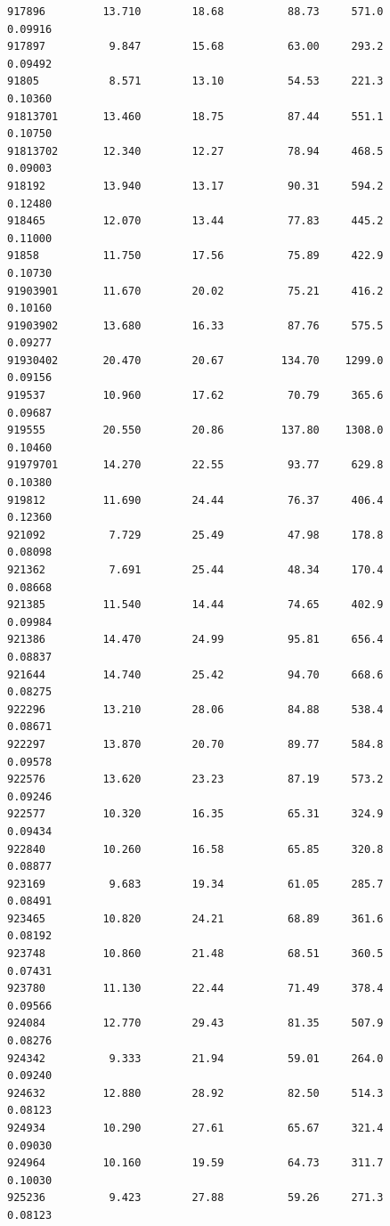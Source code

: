 \documentclass[
  letterpaper,
  DIV=11,
  numbers=noendperiod]{scrartcl}
\begin{document}
\begin{verbatim}
917896         13.710        18.68          88.73     571.0         0.09916
917897          9.847        15.68          63.00     293.2         0.09492
91805           8.571        13.10          54.53     221.3         0.10360
91813701       13.460        18.75          87.44     551.1         0.10750
91813702       12.340        12.27          78.94     468.5         0.09003
918192         13.940        13.17          90.31     594.2         0.12480
918465         12.070        13.44          77.83     445.2         0.11000
91858          11.750        17.56          75.89     422.9         0.10730
91903901       11.670        20.02          75.21     416.2         0.10160
91903902       13.680        16.33          87.76     575.5         0.09277
91930402       20.470        20.67         134.70    1299.0         0.09156
919537         10.960        17.62          70.79     365.6         0.09687
919555         20.550        20.86         137.80    1308.0         0.10460
91979701       14.270        22.55          93.77     629.8         0.10380
919812         11.690        24.44          76.37     406.4         0.12360
921092          7.729        25.49          47.98     178.8         0.08098
921362          7.691        25.44          48.34     170.4         0.08668
921385         11.540        14.44          74.65     402.9         0.09984
921386         14.470        24.99          95.81     656.4         0.08837
921644         14.740        25.42          94.70     668.6         0.08275
922296         13.210        28.06          84.88     538.4         0.08671
922297         13.870        20.70          89.77     584.8         0.09578
922576         13.620        23.23          87.19     573.2         0.09246
922577         10.320        16.35          65.31     324.9         0.09434
922840         10.260        16.58          65.85     320.8         0.08877
923169          9.683        19.34          61.05     285.7         0.08491
923465         10.820        24.21          68.89     361.6         0.08192
923748         10.860        21.48          68.51     360.5         0.07431
923780         11.130        22.44          71.49     378.4         0.09566
924084         12.770        29.43          81.35     507.9         0.08276
924342          9.333        21.94          59.01     264.0         0.09240
924632         12.880        28.92          82.50     514.3         0.08123
924934         10.290        27.61          65.67     321.4         0.09030
924964         10.160        19.59          64.73     311.7         0.10030
925236          9.423        27.88          59.26     271.3         0.08123

\end{verbatim}
\end{document}
